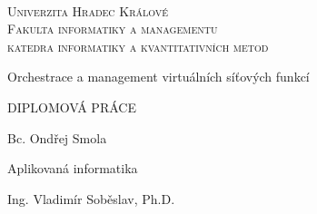 \documentclass[a4paper,czech,czech,openright,cleardoubleempty,BCOR10mm,DIV11]{scrreprt}
\newcommand{\noun}[1]{\textsc{#1}}
\begin{document}
\cleardoublepage{}~\thispagestyle{empty}\begin{center}\vspace{10mm}


\textsf{\textsc{\noun{\LARGE Univerzita Hradec Králové}}}\\
\vspace{0.5em}
\textsc{\noun{\LARGE Fakulta informatiky a managementu}}\\
\vspace*{1em}
\textsf{\textsc{\noun{\Large katedra informatiky a kvantitativních metod }}}

\vspace{15mm}


\vspace{15mm}

\textsf{\LARGE Orchestrace a management virtuálních síťových funkcí}{\LARGE \par}


\vspace{15mm}

\textsf{\LARGE DIPLOMOVÁ PRÁCE}{\LARGE \par}

\vspace{10mm}


\end{center} 

\vspace*{\fill}


\vspace{10mm}

\begin{description}
\item [{{\large Autor:}}] \noindent \textsf{\large Bc. Ondřej Smola}{\large \par}
\item [{{\large Studijní obor:}}] \noindent \textsf{\large Aplikovaná informatika}{\large \par}
\item [{{\large Vedoucí~práce:}}] \noindent \textsf{\large Ing. Vladimír Soběslav, Ph.D.}{\large{}
\item {}
}{\large \par}
\end{description}
\clearpage{}

\end{document}
